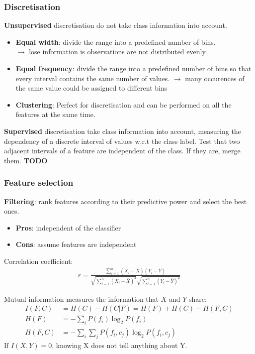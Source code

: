 \subsubsection*{Discretisation}
\textbf{Unsupervised} discretisation do not take class information into account.
\begin{itemize}
	\item \textbf{Equal width}: divide the range into a predefined number of bins.\\
	$\rightarrow$ lose information is observations are not distributed evenly.
	\item \textbf{Equal frequency}: divide the range into a predefined number of bins so that every interval contains the same number of values.
	$\rightarrow$ many occurences of the same value could be assigned to different bins
	\item \textbf{Clustering}: Perfect for discretisation and can be performed on all the features at the same time.
\end{itemize}

\textbf{Supervised} discretisation take class information into account, measuring the dependency of a discrete interval of values w.r.t the class label. Test that two adjacent intervals of a feature are independent of the class. If they are, merge them.
\textbf{TODO}

\subsubsection*{Feature selection}
\textbf{Filtering}: rank features according to their predictive power and select the best ones.
\begin{itemize}
	\item \textbf{Pros}: independent of the classifier
	\item \textbf{Cons}: assume features are independent
\end{itemize}


Correlation coefficient:
\begin{align*}
	r = \frac{\sum_{i = 1}^n (X_i - \bar{X})(Y_i - \bar{Y})}{\sqrt{\sum_{i = 1}^n (X_i - \bar{X})^2} \sqrt{\sum_{i = 1}^n (Y_i - \bar{Y})^2}}
\end{align*}

Mutual information measures the information that $X$ and $Y$ share:
\begin{align*}
	I(F, C) &= H(C) - H(C | F) = H(F) + H(C) - H(F, C)\\
	H(F) &= - \sum_i P(f_i) \log_2 P(f_i)\\
	H(F, C) &= - \sum_i \sum_j P(f_i, c_j) \log_2 P(f_i, c_j)
\end{align*}
If $I(X, Y) = 0$, knowing X does not tell anything about Y.

